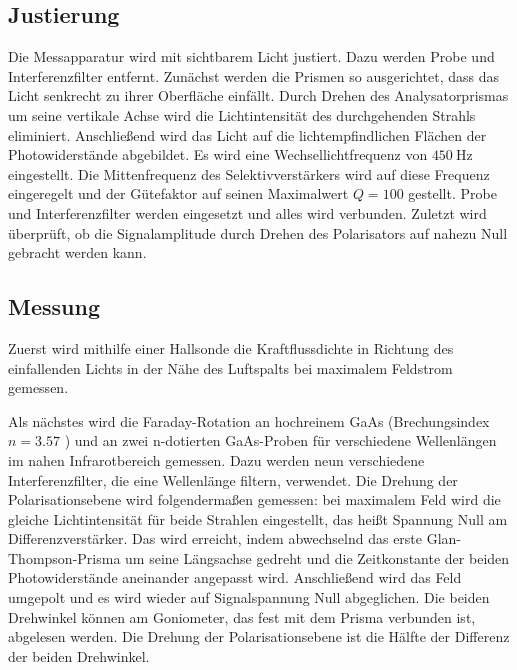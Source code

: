 \subsection{Justierung}
Die Messapparatur wird mit sichtbarem Licht justiert. Dazu werden Probe und Interferenzfilter entfernt.
Zunächst werden die Prismen so ausgerichtet, dass das Licht senkrecht zu ihrer Oberfläche einfällt. Durch Drehen des Analysatorprismas um seine vertikale Achse wird die Lichtintensität des durchgehenden Strahls eliminiert.
Anschließend wird das Licht auf die lichtempfindlichen Flächen der Photowiderstände abgebildet.
Es wird eine Wechsellichtfrequenz von $\SI{450}{\hertz}$ eingestellt. Die Mittenfrequenz des Selektivverstärkers wird auf diese Frequenz eingeregelt und der Gütefaktor auf seinen Maximalwert $Q = \num{100}$ gestellt.
Probe und Interferenzfilter werden eingesetzt und alles wird verbunden. Zuletzt wird überprüft, ob die Signalamplitude durch Drehen des Polarisators auf nahezu Null gebracht werden kann.

\subsection{Messung}
Zuerst wird mithilfe einer Hallsonde die Kraftflussdichte in Richtung des einfallenden Lichts in der Nähe des Luftspalts bei maximalem Feldstrom gemessen.

Als nächstes wird die Faraday-Rotation an hochreinem GaAs (Brechungsindex $n= \num{3.57}$ \cite{chemical}) und an zwei n-dotierten GaAs-Proben für verschiedene Wellenlängen im nahen Infrarotbereich gemessen. Dazu werden neun verschiedene Interferenzfilter, die eine Wellenlänge filtern, verwendet.
Die Drehung der Polarisationsebene wird folgendermaßen gemessen: bei maximalem Feld wird die gleiche Lichtintensität für beide Strahlen eingestellt, das heißt Spannung Null am Differenzverstärker. Das wird erreicht, indem abwechselnd das erste Glan-Thompson-Prisma um seine Längsachse gedreht und die Zeitkonstante der beiden Photowiderstände aneinander angepasst wird. Anschließend wird das Feld umgepolt und es wird wieder auf Signalspannung Null abgeglichen. Die beiden Drehwinkel können am Goniometer, das fest mit dem Prisma verbunden ist, abgelesen werden. Die Drehung der Polarisationsebene ist die Hälfte der Differenz der beiden Drehwinkel.
